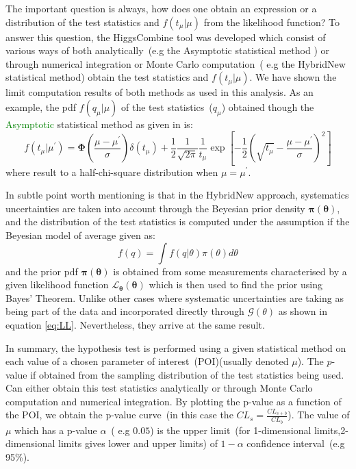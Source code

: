 The important question is always, how does one obtain an expression or a distribution of the test statistics and $f(t_{\mu}|\mu)$ from the likelihood function? To answer this question, the HiggsCombine tool was developed which consist of various ways of both analytically~(e.g the Asymptotic statistical method \cite{ASYMP}) or through numerical integration or Monte Carlo computation~( e.g the HybridNew statistical method) obtain the test statistics and $ f(t_{\mu}|\mu)$. We have shown the limit computation results of both methods as used in this analysis.
As an example, the pdf $ f(q_{\mu}|\mu)$ of the test statistics~($q_{\mu}$) obtained though the \textcolor{green}{Asymptotic} statistical method as given in \cite{ASYMP} is:
\begin{equation}\label{eq:ASYPTOTIC}
f(t_{\mu}|{\mu}^{\prime}) = \mathbf{\Phi}\left( \frac{\mu -{\mu}^{\prime}}{\sigma}\right)\delta(t_{\mu}) +
                             \frac{1}{2}\frac{1}{\sqrt{2\pi}}\frac{1}{t_{\mu}}\exp\left[-\frac{1}{2} \left(  \sqrt{t_{\mu}} - \frac{\mu - {\mu}^{\prime}}{\sigma}\right)^{2} \right]
\end{equation}
where result to a half-chi-square distribution when $\mu = \mu^{\prime}$.

In subtle point worth mentioning is that in the HybridNew approach, systematics uncertainties are taken into account through the Beyesian prior density $\mathbf{\pi(\theta)}$, and the distribution of the test statistics is computed under the assumption if the Beyesian model of average given as: $$\displaystyle{f(q) = \int f(q|\theta)\pi(\theta)d\theta}$$ and the prior pdf $\mathbf{\pi(\theta)}$ is obtained from some measurements characterised by a given likelihood function $\mathcal{L}_{\mathbf{\theta}}(\mathbf{\theta} )$ which is then used to find the prior using Bayes' Theorem. Unlike other cases where systematic uncertainties are taking as being part of the data and incorporated directly through $\mathcal{G}(\theta)$ as shown in equation \ref{eq:LL}. Nevertheless, they arrive at the same result.

\par
In summary, the hypothesis test is performed using a given statistical method on each value of a chosen parameter of interest~(POI)(usually denoted $\mu$). The $p$-value if obtained from the sampling distribution of the test statistics being used. Can either obtain this test statistics analytically or through Monte Carlo computation and  numerical integration. By plotting the p-value as a function of the POI, we obtain the p-value curve~(in this case the $CL_{s} = \frac{CL_{s+b}}{CL_{b}}$).
The value of $\mu$ which has a p-value $\alpha$~( e.g $0.05$) is the upper limit~(for 1-dimensional limits,2-dimensional limits gives lower and upper limits) of $1 - \alpha$  confidence interval~(e.g 95\%).


